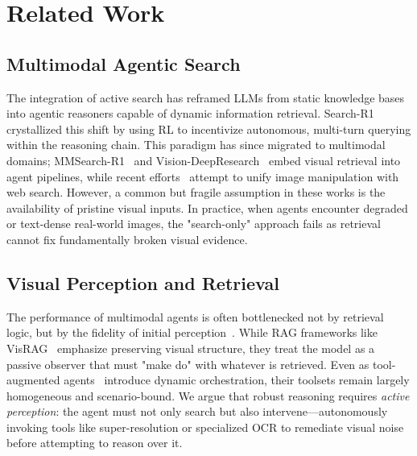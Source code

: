 \section{Related Work}
\label{sec:related_work}

\subsection{Multimodal Agentic Search}
The integration of active search has reframed LLMs from static knowledge bases into agentic reasoners capable of dynamic information retrieval. Search-R1~\citep{jin2025searchr1trainingllmsreason} crystallized this shift by using RL to incentivize autonomous, multi-turn querying within the reasoning chain. This paradigm has since migrated to multimodal domains; MMSearch-R1~\citep{mmsearch-r1} and Vision-DeepResearch~\citep{huang2026vision, deepmmsearch_r1} embed visual retrieval into agent pipelines, while recent efforts~\citep{zhang2025skywork, yao2026mm,chen2026unify,feng2026gen, li2025websailornavigatingsuperhumanreasoning} attempt to unify image manipulation with web search. However, a common but fragile assumption in these works is the availability of pristine visual inputs. In practice, when agents encounter degraded or text-dense real-world images, the "search-only" approach fails as retrieval cannot fix fundamentally broken visual evidence.

\subsection{Visual Perception and Retrieval}
The performance of multimodal agents is often bottlenecked not by retrieval logic, but by the fidelity of initial perception~\cite{zhang2026fix,wei2025perception}. While RAG frameworks like VisRAG~\citep{yu2024visrag} emphasize preserving visual structure, they treat the model as a passive observer that must "make do" with whatever is retrieved. Even as tool-augmented agents~\citep{song2026adareasonerdynamictoolorchestration, deepeyesv2, webwatcher} introduce dynamic orchestration, their toolsets remain largely homogeneous and scenario-bound. We argue that robust reasoning requires \emph{active perception}: the agent must not only search but also intervene—autonomously invoking tools like super-resolution or specialized OCR to remediate visual noise before attempting to reason over it.

